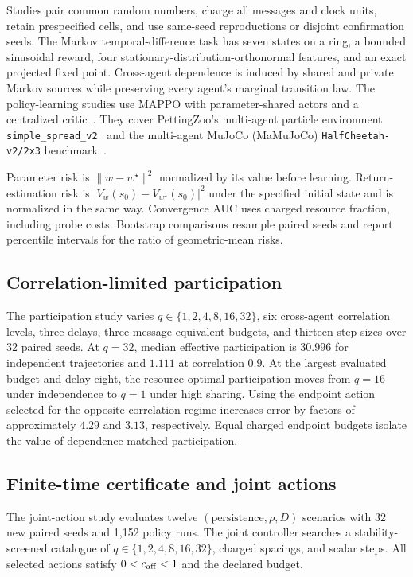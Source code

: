 \documentclass[journal]{IEEEtran}
\begin{document}
Studies pair common random numbers, charge all messages and clock units, retain prespecified cells, and use same-seed reproductions or disjoint confirmation seeds.
The Markov temporal-difference task has seven states on a ring, a bounded sinusoidal reward, four stationary-distribution-orthonormal features, and an exact projected fixed point.
Cross-agent dependence is induced by shared and private Markov sources while preserving every agent's marginal transition law.
The policy-learning studies use MAPPO with parameter-shared actors and a centralized critic~\cite{yu2022mappo}.
They cover PettingZoo's multi-agent particle environment \texttt{simple\_spread\_v2}~\cite{terry2021pettingzoo} and the multi-agent MuJoCo (MaMuJoCo) \texttt{HalfCheetah-v2/2x3} benchmark~\cite{peng2021facmac}.

Parameter risk is $\|w-w^\star\|^2$ normalized by its value before learning.
Return-estimation risk is $|V_w(s_0)-V_{w^\star}(s_0)|^2$ under the specified initial state and is normalized in the same way.
Convergence AUC uses charged resource fraction, including probe costs.
Bootstrap comparisons resample paired seeds and report percentile intervals for the ratio of geometric-mean risks.

\subsection{Correlation-limited participation}
The participation study varies $q\in\{1,2,4,8,16,32\}$, six cross-agent correlation levels, three delays, three message-equivalent budgets, and thirteen step sizes over 32 paired seeds.
At $q=32$, median effective participation is $30.996$ for independent trajectories and $1.111$ at correlation $0.9$.
At the largest evaluated budget and delay eight, the resource-optimal participation moves from $q=16$ under independence to $q=1$ under high sharing.
Using the endpoint action selected for the opposite correlation regime increases error by factors of approximately $4.29$ and $3.13$, respectively.
Equal charged endpoint budgets isolate the value of dependence-matched participation.

\subsection{Finite-time certificate and joint actions}
The joint-action study evaluates twelve $(\text{persistence},\rho,D)$ scenarios with 32 new paired seeds and 1,152 policy runs.
The joint controller searches a stability-screened catalogue of $q\in\{1,2,4,8,16,32\}$, charged spacings, and scalar steps.
All selected actions satisfy $0<c_{\rm aff}<1$ and the declared budget.
\end{document}
